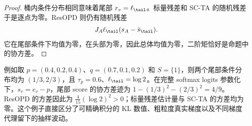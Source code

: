 \begin{proof}
桶内条件分布相同意味着尾部 $r_v=\ell_{\tail}$。标量残差和 SC-TA 的随机残差于是逐点为零。ResOPD 则仍有随机残差
\[
 J_A\ell_{\tail}(s_A-\bar s_\tail).
\]
它在尾部条件下均值为零，在头部为零，因此总体均值为零，二阶矩恰好是命题中的协方差。
\end{proof}

例如取 $p=(0.4,0.2,0.4)$、$q=(0.7,0.1,0.2)$ 和 $S=\{1\}$，则两个尾部条件分布均为 $(1/3,2/3)$，且 $\tau_p=0.6$、$\ell_{\tail}=\log2$。在完整 softmax logits 参数化下，$s_v=e_v-p$，尾部 score 的协方差迹为 $1-(1/3)^2-(2/3)^2=4/9$。ResOPD 的方差因此为 $\frac4{15}(\log2)^2>0$；标量残差估计量与 SC-TA 的方差均为零。这个例子直接区分了可精确积分的 KL 数值、粗粒度真实梯度以及不同梯度代理留下的抽样波动。
